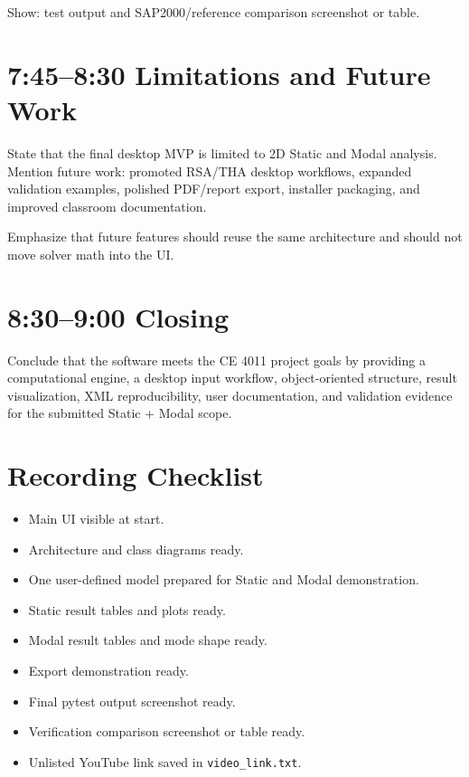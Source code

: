 \documentclass[11pt,a4paper]{article}
\begin{document}
Show: test output and SAP2000/reference comparison screenshot or table.

\section{7:45--8:30 Limitations and Future Work}

State that the final desktop MVP is limited to 2D Static and Modal analysis. Mention future work: promoted RSA/THA desktop workflows, expanded validation examples, polished PDF/report export, installer packaging, and improved classroom documentation.

Emphasize that future features should reuse the same architecture and should not move solver math into the UI.

\section{8:30--9:00 Closing}

Conclude that the software meets the CE 4011 project goals by providing a computational engine, a desktop input workflow, object-oriented structure, result visualization, XML reproducibility, user documentation, and validation evidence for the submitted Static + Modal scope.

\section{Recording Checklist}

\begin{itemize}
\item Main UI visible at start.
\item Architecture and class diagrams ready.
\item One user-defined model prepared for Static and Modal demonstration.
\item Static result tables and plots ready.
\item Modal result tables and mode shape ready.
\item Export demonstration ready.
\item Final pytest output screenshot ready.
\item Verification comparison screenshot or table ready.
\item Unlisted YouTube link saved in \texttt{video\_link.txt}.
\end{itemize}
\end{document}
